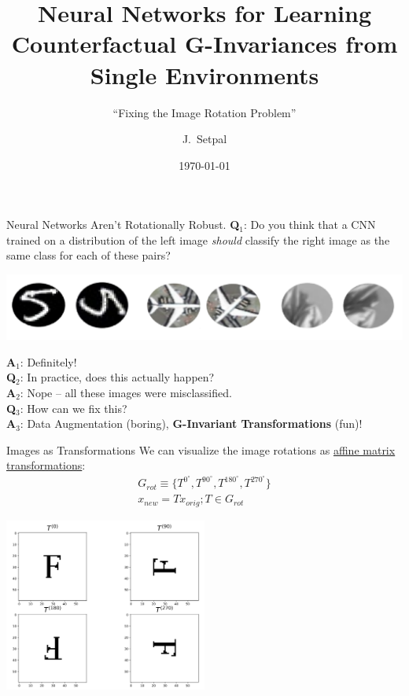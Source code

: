 \documentclass{beamer}
\title[G-Transformation Invaraiance]{Neural Networks for Learning Counterfactual G-Invariances from Single Environments}
\subtitle{``Fixing the Image Rotation Problem''}
\author[Machine Learning @ Purdue] %
{J.~Setpal}
\date{\today}
\begin{document}
\frame{\titlepage}

\begin{frame}{Neural Networks Aren't Rotationally Robust.}
	\textbf{Q}${}_1$: Do you think that a CNN trained on a distribution of the left image \textit{should} classify the right image as the same class for each of these pairs?
	\vspace{-.9em}
	\begin{center}
		\includegraphics[width=\textwidth]{img/rot.png}
	\end{center} 
	\pause
	\vspace{-1em}
	\textbf{A}${}_1$: Definitely! \pause \newline \\
	\textbf{Q}${}_2$: In practice, does this actually happen? \pause \\
	\textbf{A}${}_2$: Nope -- all these images were misclassified. \pause \newline \\
	\textbf{Q}${}_3$: How can we fix this? \pause \\
	\textbf{A}${}_3$: Data Augmentation (boring)\pause, \textbf{G-Invariant Transformations} (fun)!
\end{frame}

\begin{frame}{Images as Transformations}
	We can visualize the image rotations as \underline{affine matrix transformations}:
	\begin{gather}
		G_{rot} \equiv \{T^{0^\circ}, T^{90^\circ}, T^{180^\circ}, T^{270^\circ}\} \\
		x_{new} = T x_{orig}; T \in G_{rot}
	\end{gather}
	\vspace{-2em}
	\begin{center}
		\includegraphics[width=0.5\textwidth]{img/f_rots.png}
	\end{center}
\end{frame}
\end{document}

